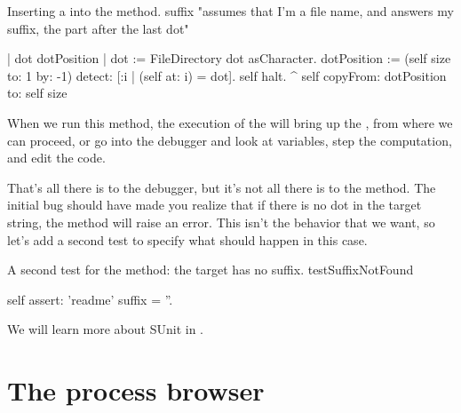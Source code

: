 \documentclass[a4paper,10pt,twoside]{book}
\begin{document}
\needspace{11ex}
\begin{method}[suffix]{Inserting a  into the  method.}
suffix
	"assumes that I'm a file name, and answers my suffix, the part after the last dot"

	| dot dotPosition |
	dot := FileDirectory dot asCharacter.
	dotPosition := (self size to: 1 by: -1) detect: [:i | (self at: i) = dot].
	self halt.
	^ self copyFrom: dotPosition to: self size
\end{method}

When we run this method, the execution of the  will bring up the , from where we can proceed, or go into the debugger and look at variables, step the computation, and edit the code.

That's all there is to the debugger, but it's not all there is to the  method.
The initial bug should have made you realize that if there is no dot in the target string, the  method will raise an error.
This isn't the behavior that we want, so let's add a second test to specify what should happen in this case.

\begin{method}[testNoSuffix]{A second test for the  method: the target has no suffix.}
testSuffixNotFound

	self assert: 'readme' suffix = ''.
\end{method}



We will learn more about SUnit in .


\section{The process browser}
\end{document}
